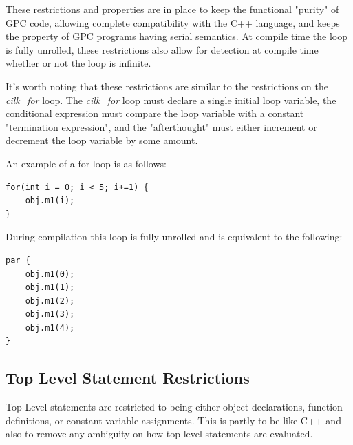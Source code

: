 These restrictions and properties are in place to keep the functional "purity" of GPC code,
allowing complete compatibility with the C++ language, and keeps the property of GPC programs
having serial semantics.  
At compile time the loop is fully unrolled, these restrictions also allow for detection
at compile time whether or not the loop is infinite.  

It's worth noting that these restrictions are similar to the restrictions on the \textit{cilk\_for} loop.
The \textit{cilk\_for} loop must declare a single initial loop variable, the conditional expression must 
compare the loop variable with a constant "termination expression", and the "afterthought" must either increment
or decrement the loop variable by some amount.
\cite{cilkfor}

An example of a for loop is as follows:


\begin{lstlisting}[style=myGPC]
for(int i = 0; i < 5; i+=1) {
    obj.m1(i);
}
\end{lstlisting}


During compilation this loop is fully unrolled and is equivalent
to the following:

\begin{lstlisting}[style=myGPC]
par {
    obj.m1(0);
    obj.m1(1);
    obj.m1(2);
    obj.m1(3);
    obj.m1(4);
}
\end{lstlisting}


\subsection{Top Level Statement Restrictions}
Top Level statements are restricted to being either object declarations, function definitions,
or constant variable assignments. This is partly to be like C++ and also to remove any ambiguity
on how top level statements are evaluated.
